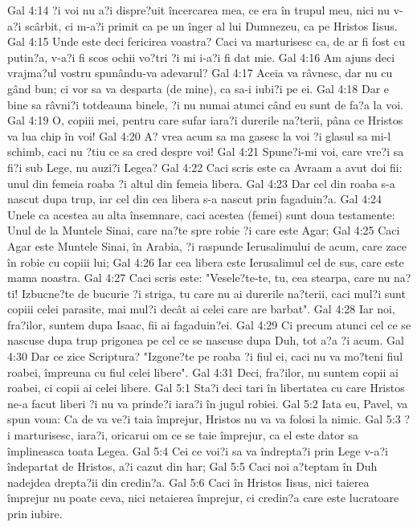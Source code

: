 Gal 4:14  ?i voi nu a?i dispre?uit încercarea mea, ce era în trupul meu, nici nu v-a?i scârbit, ci m-a?i primit ca pe un înger al lui Dumnezeu, ca pe Hristos Iisus.
Gal 4:15  Unde este deci fericirea voastra? Caci va marturisesc ca, de ar fi fost cu putin?a, v-a?i fi scos ochii vo?tri ?i mi i-a?i fi dat mie.
Gal 4:16  Am ajuns deci vrajma?ul vostru spunându-va adevarul?
Gal 4:17  Aceia va râvnesc, dar nu cu gând bun; ci vor sa va desparta (de mine), ca sa-i iubi?i pe ei.
Gal 4:18  Dar e bine sa râvni?i totdeauna binele, ?i nu numai atunci când eu sunt de fa?a la voi.
Gal 4:19  O, copiii mei, pentru care sufar iara?i durerile na?terii, pâna ce Hristos va lua chip în voi!
Gal 4:20  A? vrea acum sa ma gasesc la voi ?i glasul sa mi-l schimb, caci nu ?tiu ce sa cred despre voi!
Gal 4:21  Spune?i-mi voi, care vre?i sa fi?i sub Lege, nu auzi?i Legea?
Gal 4:22  Caci scris este ca Avraam a avut doi fii: unul din femeia roaba ?i altul din femeia libera.
Gal 4:23  Dar cel din roaba s-a nascut dupa trup, iar cel din cea libera s-a nascut prin fagaduin?a.
Gal 4:24  Unele ca acestea au alta însemnare, caci acestea (femei) sunt doua testamente: Unul de la Muntele Sinai, care na?te spre robie ?i care este Agar;
Gal 4:25  Caci Agar este Muntele Sinai, în Arabia, ?i raspunde Ierusalimului de acum, care zace în robie cu copiii lui;
Gal 4:26  Iar cea libera este Ierusalimul cel de sus, care este mama noastra.
Gal 4:27  Caci scris este: "Vesele?te-te, tu, cea stearpa, care nu na?ti! Izbucne?te de bucurie ?i striga, tu care nu ai durerile na?terii, caci mul?i sunt copiii celei parasite, mai mul?i decât ai celei care are barbat".
Gal 4:28  Iar noi, fra?ilor, suntem dupa Isaac, fii ai fagaduin?ei.
Gal 4:29  Ci precum atunci cel ce se nascuse dupa trup prigonea pe cel ce se nascuse dupa Duh, tot a?a ?i acum.
Gal 4:30  Dar ce zice Scriptura? "Izgone?te pe roaba ?i fiul ei, caci nu va mo?teni fiul roabei, împreuna cu fiul celei libere".
Gal 4:31  Deci, fra?ilor, nu suntem copii ai roabei, ci copii ai celei libere.
Gal 5:1  Sta?i deci tari în libertatea cu care Hristos ne-a facut liberi ?i nu va prinde?i iara?i în jugul robiei.
Gal 5:2  Iata eu, Pavel, va spun voua: Ca de va ve?i taia împrejur, Hristos nu va va folosi la nimic.
Gal 5:3  ?i marturisesc, iara?i, oricarui om ce se taie împrejur, ca el este dator sa împlineasca toata Legea.
Gal 5:4  Cei ce voi?i sa va îndrepta?i prin Lege v-a?i îndepartat de Hristos, a?i cazut din har;
Gal 5:5  Caci noi a?teptam în Duh nadejdea drepta?ii din credin?a.
Gal 5:6  Caci în Hristos Iisus, nici taierea împrejur nu poate ceva, nici netaierea împrejur, ci credin?a care este lucratoare prin iubire.
